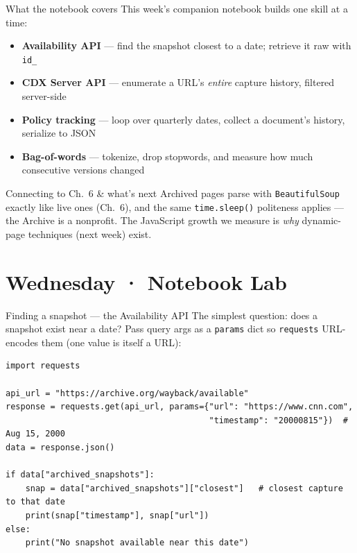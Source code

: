 \documentclass[9pt,aspectratio=169]{beamer}
\begin{document}
\begin{frame}{What the notebook covers}
    This week's companion notebook builds one skill at a time:
    \begin{itemize}
        \item \textbf{Availability API} --- find the snapshot closest to a date; retrieve it raw with \texttt{id\_}
        \item \textbf{CDX Server API} --- enumerate a URL's \textit{entire} capture history, filtered server-side
        \item \textbf{Policy tracking} --- loop over quarterly dates, collect a document's history, serialize to JSON
        \item \textbf{Bag-of-words} --- tokenize, drop stopwords, and measure how much consecutive versions changed
    \end{itemize}

    \vspace{0.75em}

    \begin{alertblock}{Connecting to Ch.~6 \& what's next}
        \footnotesize Archived pages parse with \texttt{BeautifulSoup} exactly like live ones (Ch.~6), and the same \texttt{time.sleep()} politeness applies --- the Archive is a nonprofit. The JavaScript growth we measure is \textit{why} dynamic-page techniques (next week) exist.
    \end{alertblock}
\end{frame}

\section{Wednesday · Notebook Lab}

\begin{frame}[fragile]{Finding a snapshot --- the Availability API}
    The simplest question: does a snapshot exist near a date? Pass query args as a \texttt{params} dict so \texttt{requests} URL-encodes them (one value is itself a URL):
\begin{lstlisting}
import requests

api_url = "https://archive.org/wayback/available"
response = requests.get(api_url, params={"url": "https://www.cnn.com",
                                         "timestamp": "20000815"})  # Aug 15, 2000
data = response.json()

if data["archived_snapshots"]:
    snap = data["archived_snapshots"]["closest"]   # closest capture to that date
    print(snap["timestamp"], snap["url"])
else:
    print("No snapshot available near this date")
\end{lstlisting}
\end{frame}
\end{document}
